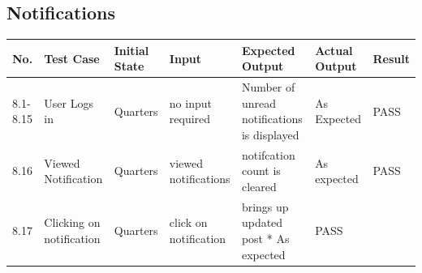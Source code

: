 \documentclass[12pt]{article}
\begin{document}
\subsection{Notifications}
\begin{longtable}{|p{1.5cm}|p{1.5cm}|p{1.5cm}|p{2cm}|p{4cm}|p{2cm}|p{1.5cm}|}
\hline
\textbf{No.} & \textbf{Test Case}  & \textbf{Initial State} & \textbf{Input} & \textbf{Expected Output} & \textbf{Actual Output} & \textbf{Result}\\ 
\hline
8.1-8.15 & User Logs in & Quarters & no input required & Number of unread notifications is displayed & As Expected & PASS \\ 
\hline
8.16 & Viewed Notification & Quarters & viewed notifications & notifcation count is cleared & As expected & PASS\\
8.17 & Clicking on notification & Quarters & click on notification & brings up updated post * As expected & PASS\\
\hline
\end{longtable}

\end{document}
